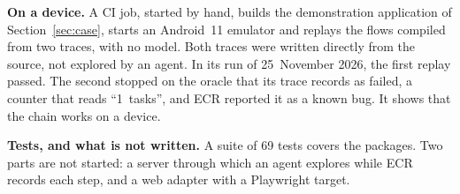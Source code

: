 \textbf{On a device.} A CI job, started by hand, builds the demonstration application of Section~\ref{sec:case}, starts an Android~11 emulator and replays the flows compiled from two traces, with no model. Both traces were written directly from the source, not explored by an agent. In its run of 25~November 2026, the first replay passed. The second stopped on the oracle that its trace records as failed, a counter that reads ``1~tasks'', and ECR reported it as a known bug. It shows that the chain works on a device.

\textbf{Tests, and what is not written.} A suite of 69 tests covers the packages. Two parts are not started: a server through which an agent explores while ECR records each step, and a web adapter with a Playwright target.
